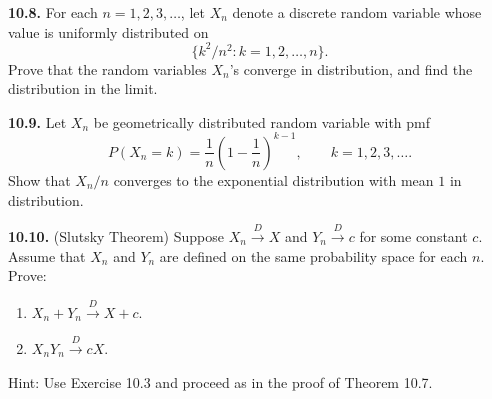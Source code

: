 \textbf{10.8.} For each $n=1,2,3,\ldots$, let $X_n$ denote a discrete random variable whose value is uniformly distributed on
\[
\{k^2/n^2:k=1,2,\ldots,n\}.
\]
Prove that the random variables $X_n$'s converge in distribution, and find the distribution in the limit.

\textbf{10.9.} Let $X_n$ be geometrically distributed random variable with pmf
\[
P(X_n=k)=\frac{1}{n}\left(1-\frac{1}{n}\right)^{k-1},
\qquad k=1,2,3,\ldots.
\]
Show that $X_n/n$ converges to the exponential distribution with mean $1$ in distribution.

\textbf{10.10.} (Slutsky Theorem) Suppose $X_n\xrightarrow{D}X$ and $Y_n\xrightarrow{D}c$ for some constant $c$. Assume that $X_n$ and $Y_n$ are defined on the same probability space for each $n$. Prove:
\begin{enumerate}
\item $X_n+Y_n\xrightarrow{D}X+c$.
\item $X_nY_n\xrightarrow{D}cX$.
\end{enumerate}
Hint: Use Exercise 10.3 and proceed as in the proof of Theorem 10.7.
